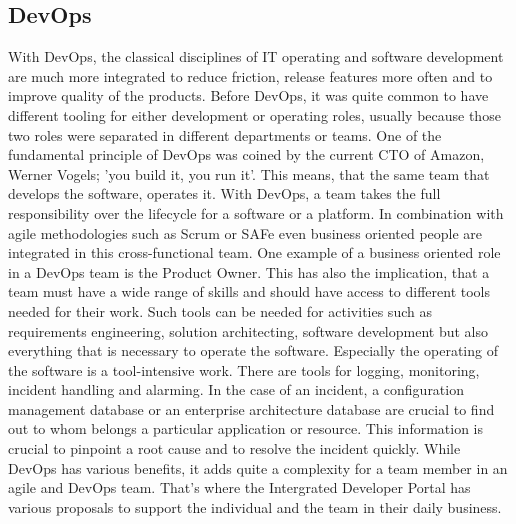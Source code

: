 \documentclass[a4paper,12pt]{article}
\begin{document}
    \subsection{DevOps}
    With DevOps, the classical disciplines of IT operating and software development are much more integrated to reduce
    friction, release features more often and to improve quality of the products\parencite{safedevops}.
    Before DevOps, it was quite common to have different tooling for either development or operating roles, usually
    because those two roles were separated in different departments or teams.
    One of the fundamental principle of DevOps was coined by the current CTO of Amazon, Werner Vogels;
    'you build it, you run it'\parencite{vogels}.
    This means, that the same team that develops the software, operates it.
    With DevOps, a team takes the full responsibility over the lifecycle for a software or a platform.
    In combination with agile methodologies such as Scrum or SAFe even business oriented people are integrated in this
    cross-functional team.
    One example of a business oriented role in a DevOps team is the Product Owner\parencite{safepo}.
    This has also the implication, that a team must have a wide range of skills and should have access to different
    tools needed for their work.
    Such tools can be needed for activities such as requirements engineering, solution architecting, software development
    but also everything that is necessary to operate the software.
    Especially the operating of the software is a tool-intensive work.
    There are tools for logging, monitoring, incident handling and alarming.
    In the case of an incident, a configuration management database or an enterprise architecture database are crucial
    to find out to whom belongs a particular application or resource.
    This information is crucial to pinpoint a root cause and to resolve the incident quickly.
    While DevOps has various benefits, it adds quite a complexity for a team member in an agile and DevOps team.
    That's where the Intergrated Developer Portal has various proposals to support the individual and the team in their
    daily business.
\end{document}
